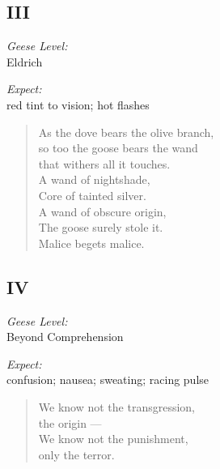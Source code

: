 \newpage

\subsection*{III}
\noindent\begin{paracol}{2}
    \begin{flushright}
      \textit{Geese Level:}\\
      Eldrich

      \textit{Expect:}\\
      red tint to vision; hot flashes
    \end{flushright}
    \switchcolumn
    \begin{verse}
      As the dove bears the olive branch, \\
      \vin so too the goose bears the wand \\
      \vin \vin that withers all it touches. \\
      A wand of nightshade, \\
      \vin Core of tainted silver. \\
      A wand of obscure origin, \\
      \vin The goose surely stole it. \\
      Malice begets malice.
    \end{verse}
\end{paracol}

\newpage

\subsection*{IV}

\noindent\begin{paracol}{2}
    \begin{flushright}
      \textit{Geese Level:}\\
      Beyond Comprehension

      \textit{Expect:}\\
      confusion; nausea; sweating; racing pulse
    \end{flushright}
  \switchcolumn
    \begin{verse}
      We know not the transgression,\\
      \vin the origin ---\\
      We know not the punishment,\\
      \vin only the terror.
    \end{verse}
\end{paracol}

